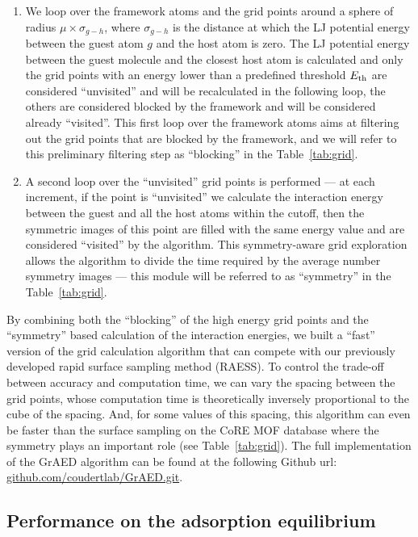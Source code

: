 \documentclass[main]{subfiles}
\begin{document}
\begin{enumerate}
  \item We loop over the framework atoms and the grid points around a sphere of radius $\mu\times\sigma_{g-h}$, where $\sigma_{g-h}$ is the distance at which the LJ potential energy between the guest atom $g$ and the host atom is zero. The LJ potential energy between the guest molecule and the closest host atom is calculated and only the grid points with an energy lower than a predefined threshold $E_{\text{th}}$ are considered ``unvisited'' and will be recalculated in the following loop, the others are considered blocked by the framework and will be considered already ``visited''. This first loop over the framework atoms aims at filtering out the grid points that are blocked by the framework, and we will refer to this preliminary filtering step as ``blocking'' in the Table~\ref{tab:grid}.
  \item A second loop over the ``unvisited'' grid points is performed --- at each increment, if the point is ``unvisited'' we calculate the interaction energy between the guest and all the host atoms within the cutoff, then the symmetric images of this point are filled with the same energy value and are considered ``visited'' by the algorithm. This symmetry-aware grid exploration allows the algorithm to divide the time required by the average number symmetry images --- this module will be referred to as ``symmetry'' in the Table~\ref{tab:grid}.
\end{enumerate}

By combining both the ``blocking'' of the high energy grid points and the ``symmetry'' based calculation of the interaction energies, we built a ``fast'' version of the grid calculation algorithm that can compete with our previously developed rapid surface sampling method (RAESS). To control the trade-off between accuracy and computation time, we can vary the spacing between the grid points, whose computation time is theoretically inversely proportional to the cube of the spacing. And, for some values of this spacing, this algorithm can even be faster than the surface sampling on the CoRE MOF database where the symmetry plays an important role (see Table~\ref{tab:grid}). The full implementation of the GrAED algorithm can be found at the following Github url: \url{github.com/coudertlab/GrAED.git}.

\subsection{Performance on the adsorption equilibrium}
\end{document}
